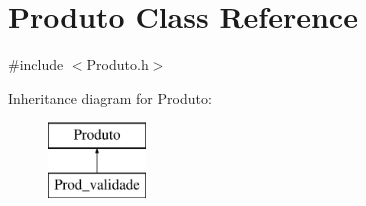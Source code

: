 \hypertarget{class_produto}{
\section{Produto Class Reference}
\label{class_produto}
}


{\ttfamily \#include $<$Produto.h$>$}

Inheritance diagram for Produto:\begin{figure}[H]
\begin{center}
\leavevmode
\includegraphics[height=2.000000cm]{class_produto}
\end{center}
\end{figure}
